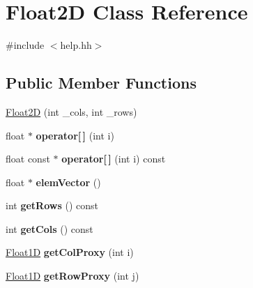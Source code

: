 \hypertarget{classFloat2D}{\section{Float2\-D Class Reference}
\label{classFloat2D}
}


{\ttfamily \#include $<$help.\-hh$>$}

\subsection*{Public Member Functions}
\begin{DoxyCompactItemize}
\item 
\hyperlink{classFloat2D_ad36162282914d4fe2d86651a51e071ff}{Float2\-D} (int \-\_\-cols, int \-\_\-rows)
\item 
\hypertarget{classFloat2D_a0c514deed419976c1de95a476148edb7}{float $\ast$ {\bfseries operator\mbox{[}$\,$\mbox{]}} (int i)}\label{classFloat2D_a0c514deed419976c1de95a476148edb7}

\item 
\hypertarget{classFloat2D_a2890be398d2b6381253169f26225e93b}{float const $\ast$ {\bfseries operator\mbox{[}$\,$\mbox{]}} (int i) const }\label{classFloat2D_a2890be398d2b6381253169f26225e93b}

\item 
\hypertarget{classFloat2D_ab7ea635b12555d35bae9c4ef87024b07}{float $\ast$ {\bfseries elem\-Vector} ()}\label{classFloat2D_ab7ea635b12555d35bae9c4ef87024b07}

\item 
\hypertarget{classFloat2D_a9f523397af4e14fb2006ad4484f95380}{int {\bfseries get\-Rows} () const }\label{classFloat2D_a9f523397af4e14fb2006ad4484f95380}

\item 
\hypertarget{classFloat2D_af029eb7eb99dc96e95095796d7ea93fa}{int {\bfseries get\-Cols} () const }\label{classFloat2D_af029eb7eb99dc96e95095796d7ea93fa}

\item 
\hypertarget{classFloat2D_abea4f5de8e07341d0564a87065af6091}{\hyperlink{classFloat1D}{Float1\-D} {\bfseries get\-Col\-Proxy} (int i)}\label{classFloat2D_abea4f5de8e07341d0564a87065af6091}

\item 
\hypertarget{classFloat2D_a6c3329adba1854ea3e9589fd7271765b}{\hyperlink{classFloat1D}{Float1\-D} {\bfseries get\-Row\-Proxy} (int j)}\label{classFloat2D_a6c3329adba1854ea3e9589fd7271765b}

\end{DoxyCompactItemize}


